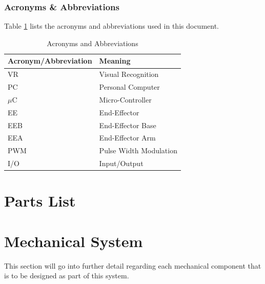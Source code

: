 \documentclass[titlepage]{article}
\begin{document}
\subsubsection{Acronyms \& Abbreviations}
Table \ref{tab:Acronyms} lists the acronyms and abbreviations used in this document.
\begin{table}[h!]
\centering
\caption{Acronyms and Abbreviations}
\begin{tabular}{| p{6cm} | p{6cm} |}\hline
	\textbf{Acronym/Abbreviation}	&\textbf{Meaning}\\\hline
	VR								&Visual Recognition\\\hline
	PC								&Personal Computer\\\hline
	$\mu$C							&Micro-Controller\\\hline
	EE								&End-Effector\\\hline
	EEB								&End-Effector Base\\\hline
	EEA								&End-Effector Arm\\\hline
	PWM								&Pulse Width Modulation\\\hline
	I/O								&Input/Output\\\hline
\end{tabular}
\label{tab:Acronyms}
\end{table}
\newpage



\section{Parts List}






















\section{Mechanical System}
This section will go into further detail regarding each mechanical component that is to be designed as part of this system.



\end{document}
